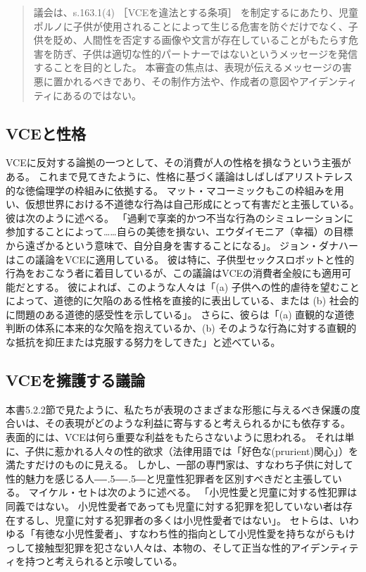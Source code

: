 \documentclass[paper=a4,book,openany]{jlreq}
\def\DDASH{―\kern-.5\zw―\kern-.5\zw―}
\begin{document}
\begin{quote}
議会は、s.163.1(4) ［VCEを違法とする条項］ を制定するにあたり、児童ポルノに子供が使用されることによって生じる危害を防ぐだけでなく、子供を貶め、人間性を否定する画像や文言が存在していることがもたらす危害を防ぎ、子供は適切な性的パートナーではないというメッセージを発信することを目的とした。
本審査の焦点は、表現が伝えるメッセージの害悪に置かれるべきであり、その制作方法や、作成者の意図やアイデンティティにあるのではない。
\end{quote}

\subsection{VCEと性格}

VCEに反対する論拠の一つとして、その消費が人の性格を損なうという主張がある。
これまで見てきたように、性格に基づく議論はしばしばアリストテレス的な徳倫理学の枠組みに依拠する。
マット・マコーミックもこの枠組みを用い、仮想世界における不道徳な行為は自己形成にとって有害だと主張している。
彼は次のように述べる。
「過剰で享楽的かつ不当な行為のシミュレーションに参加することによって……自らの美徳を損ない、エウダイモニア（幸福）の目標から遠ざかるという意味で、自分自身を害することになる」\citep[p.278]{mccormick01:_is_it_wrong_play_violen_video_games}。
ジョン・ダナハーはこの議論をVCEに適用している。
彼は特に、子供型セックスロボットと性的行為をおこなう者に着目しているが、この議論はVCEの消費者全般にも適用可能だとする。
彼によれば、このような人々は「(a) 子供への性的虐待を望むことによって、道徳的に欠陥のある性格を直接的に表出している、または (b) 社会的に問題のある道徳的感受性を示している」。
さらに、彼らは「(a) 直観的な道徳判断の体系に本来的な欠陥を抱えているか、(b) そのような行為に対する直観的な抵抗を抑圧または克服する努力をしてきた」と述べている\citep[p.86]{danaher17:_robot_rape_robot_child_sexual_abuse}。

\subsection{VCEを擁護する議論}

本書5.2.2節で見たように、私たちが表現のさまざまな形態に与えるべき保護の度合いは、その表現がどのような利益に寄与すると考えられるかにも依存する。
表面的には、VCEは何ら重要な利益をもたらさないように思われる。
それは単に、子供に惹かれる人々の性的欲求（法律用語では「好色な(prurient)関心」）を満たすだけのものに見える。
しかし、一部の専門家は、\ruby{小児性愛者}{ペドファイル}{\DDASH}すなわち子供に対して性的魅力を感じる人{\DDASH}と児童性犯罪者を区別すべきだと主張している。
マイケル・セトは次のように述べる。
「小児性愛と児童に対する性犯罪は同義ではない。
小児性愛者であっても児童に対する犯罪を犯していない者は存在するし、児童に対する犯罪者の多くは小児性愛者ではない」\citep{apabooks18:_michael_c}。
セトらは、いわゆる「有徳な小児性愛者」、すなわち性的指向として小児性愛を持ちながらもけっして接触型犯罪を犯さない人々は、本物の、そして正当な性的アイデンティティを持つと考えられると示唆している\citep{seto12:_is_pedop_sexual_orien}。
\end{document}

